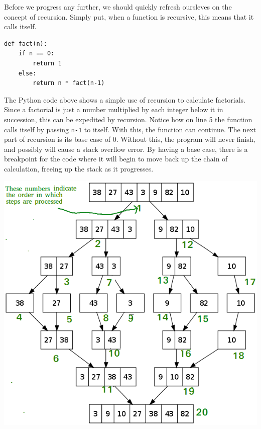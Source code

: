 \documentclass[letterpaper, 10pt]{article}
\begin{document}
Before we progress any further, we should quickly refresh oursleves on the concept of recursion. Simply put, when a function is recursive, this means that it calls itself.




\begin{center}
\begin{small}
\begin{verbatim}
def fact(n):
	if n == 0:
		return 1
	else:
		return n * fact(n-1)

\end{verbatim}
\end{small}

\end{center}
The Python code above shows a simple use of recursion to calculate factorials. Since a factorial is just a number multiplied by each integer below it in succession, this can be expedited by recursion. Notice how on line 5 the function calls itself by passing \texttt{n-1} to itself. With this, the function can continue. The next part of recursion is its base case of 0. Without this, the program will never finish, and possibly will cause a stack overflow error. By having a base case, there is a breakpoint for the code where it will begin to move back up the chain of calculation, freeing up the stack as it progresses.







\begin{center}
\includegraphics[width=\textwidth]{img/MergeSort.png}
\end{center}
\end{document}
